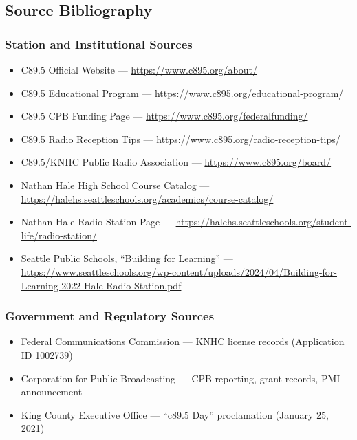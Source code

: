 \documentclass[11pt,letterpaper]{article}
\begin{document}
\subsection{Source Bibliography}

\subsubsection{Station and Institutional Sources}
\begin{itemize}[leftmargin=2em]
\item C89.5 Official Website --- \url{https://www.c895.org/about/}
\item C89.5 Educational Program --- \url{https://www.c895.org/educational-program/}
\item C89.5 CPB Funding Page --- \url{https://www.c895.org/federalfunding/}
\item C89.5 Radio Reception Tips --- \url{https://www.c895.org/radio-reception-tips/}
\item C89.5/KNHC Public Radio Association --- \url{https://www.c895.org/board/}
\item Nathan Hale High School Course Catalog --- \url{https://halehs.seattleschools.org/academics/course-catalog/}
\item Nathan Hale Radio Station Page --- \url{https://halehs.seattleschools.org/student-life/radio-station/}
\item Seattle Public Schools, ``Building for Learning'' --- \url{https://www.seattleschools.org/wp-content/uploads/2024/04/Building-for-Learning-2022-Hale-Radio-Station.pdf}
\end{itemize}

\subsubsection{Government and Regulatory Sources}
\begin{itemize}[leftmargin=2em]
\item Federal Communications Commission --- KNHC license records (Application ID 1002739)
\item Corporation for Public Broadcasting --- CPB reporting, grant records, PMI announcement
\item King County Executive Office --- ``c89.5 Day'' proclamation (January 25, 2021)
\end{itemize}
\end{document}
